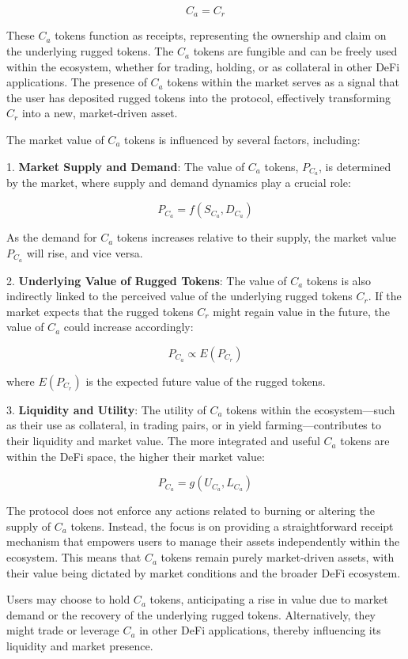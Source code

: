 \documentclass{article}
\begin{document}
\[
C_a = C_r
\]

These $C_a$ tokens function as receipts, representing the ownership and claim on the underlying rugged tokens. The $C_a$ tokens are fungible and can be freely used within the ecosystem, whether for trading, holding, or as collateral in other DeFi applications. The presence of $C_a$ tokens within the market serves as a signal that the user has deposited rugged tokens into the protocol, effectively transforming $C_r$ into a new, market-driven asset.

The market value of $C_a$ tokens is influenced by several factors, including:

1. \textbf{Market Supply and Demand}: The value of $C_a$ tokens, $P_{C_a}$, is determined by the market, where supply and demand dynamics play a crucial role:

\[
P_{C_a} = f(S_{C_a}, D_{C_a})
\]

As the demand for $C_a$ tokens increases relative to their supply, the market value $P_{C_a}$ will rise, and vice versa.

2. \textbf{Underlying Value of Rugged Tokens}: The value of $C_a$ tokens is also indirectly linked to the perceived value of the underlying rugged tokens $C_r$. If the market expects that the rugged tokens $C_r$ might regain value in the future, the value of $C_a$ could increase accordingly:

\[
P_{C_a} \propto E(P_{C_r})
\]

where $E(P_{C_r})$ is the expected future value of the rugged tokens.

3. \textbf{Liquidity and Utility}: The utility of $C_a$ tokens within the ecosystem—such as their use as collateral, in trading pairs, or in yield farming—contributes to their liquidity and market value. The more integrated and useful $C_a$ tokens are within the DeFi space, the higher their market value:

\[
P_{C_a} = g(U_{C_a}, L_{C_a})
\]

The protocol does not enforce any actions related to burning or altering the supply of $C_a$ tokens. Instead, the focus is on providing a straightforward receipt mechanism that empowers users to manage their assets independently within the ecosystem. This means that $C_a$ tokens remain purely market-driven assets, with their value being dictated by market conditions and the broader DeFi ecosystem. 

Users may choose to hold $C_a$ tokens, anticipating a rise in value due to market demand or the recovery of the underlying rugged tokens. Alternatively, they might trade or leverage $C_a$ in other DeFi applications, thereby influencing its liquidity and market presence.
\end{document}
